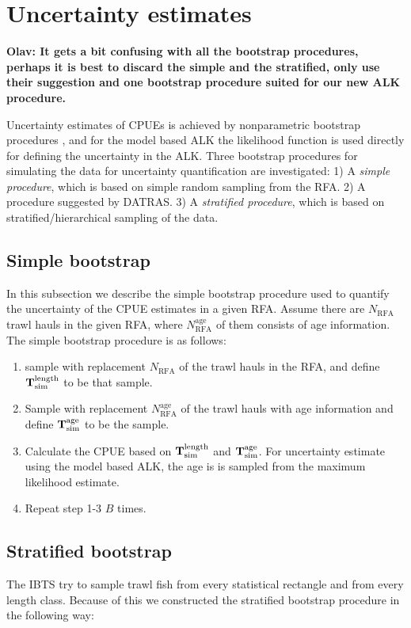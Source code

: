 \documentclass[a4paper 12pt]{article}
\numberwithin{equation}{section}
\begin{document}
\section{Uncertainty estimates}
{\bf Olav: It gets a bit confusing with all the bootstrap procedures, perhaps it is best to discard the simple and the stratified, only use their suggestion and one bootstrap procedure suited for our new ALK procedure.}


Uncertainty estimates of CPUEs is achieved by nonparametric bootstrap procedures \citep{carpenter2000bootstrap}, and for the model based ALK the likelihood function is used directly for defining the uncertainty in the ALK.  Three bootstrap procedures for simulating the data for uncertainty quantification are investigated: 1) A \textit{simple procedure}, which is based on simple random sampling from the RFA. 2) A procedure suggested by DATRAS. 3) A \textit{stratified procedure}, which is based on stratified/hierarchical sampling of the data.

\subsection{Simple bootstrap}
\label{simpleboot}
In this subsection we describe the simple bootstrap procedure used to quantify the uncertainty of the CPUE estimates in a given RFA. Assume there are $N_{\text{RFA}}$ trawl hauls in the given RFA, where $N_{\text{RFA}}^{\text{age}}$ of them consists of age information. The simple bootstrap procedure is as follows:

\begin{enumerate}
\item sample with replacement $N_{\text{RFA}}$ of the trawl hauls in the RFA, and define ${\bf T}_{\text{sim}}^{\text{length}}$ to be that sample.
\item Sample with replacement $N_{\text{RFA}}^{\text{age}}$ of the trawl hauls with age information and define ${\bf T}_{\text{sim}}^{\text{age}}$ to be the sample.
\item Calculate the CPUE based on ${\bf T }_{\text{sim}}^{\text{length}}$ and ${\bf T}_{\text{sim}}^{\text{age}}$. For uncertainty estimate using the model based ALK, the age is is sampled from the maximum likelihood estimate. 
\item Repeat step 1-3 $B$ times.
\end{enumerate}  



\subsection{Stratified bootstrap}
\label{stratboot}
The IBTS try to sample trawl fish from every statistical rectangle and from every length class. Because of this we constructed the stratified bootstrap procedure in the following way: 
\end{document}
